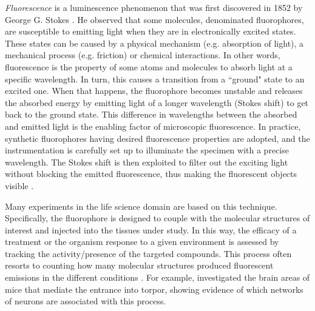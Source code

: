 \emph{Fluorescence} is a luminescence phenomenon that was first discovered in 1852 by George G. Stokes \cite{stokes2010memoir}. 
He observed that some molecules, denominated fluorophores, are susceptible to emitting light when they are in electronically excited states. These states can be caused by a physical mechanism (e.g. absorption of light), a mechanical process (e.g. friction) or chemical interactions.
In other words, fluorescence is the property of some atoms and molecules to absorb light at a specific wavelength. In turn, this causes a transition from a ``ground" state to an excited one. When that happens, the fluorophore becomes unstable and releases the absorbed energy by emitting light of a longer wavelength (Stokes shift) to get back to the ground state.
This difference in wavelengths between the absorbed and emitted light is the enabling factor of microscopic fluorescence. 
In practice, synthetic fluorophores having desired fluorescence properties are adopted, and the 
instrumentation is carefully set up to illuminate the specimen with a precise wavelength. The Stokes shift is then exploited to filter out the exciting light without blocking the emitted fluorescence, thus making the fluorescent objects visible \cite{lichtman2005fluorescence}.

Many experiments in the life science domain are based on this technique.
Specifically, the fluorophore is designed to couple with the molecular structures of interest and injected into the tissues under study. 
In this way, the efficacy of a treatment or the organism response to a given environment is assessed by tracking the activity/presence of the targeted compounds. 
This process often resorts to counting how many molecular structures produced fluorescent emissions in the different conditions \cite{hitrec2019neural, hitrec2021reversible, da2020median}.
For example,  investigated the brain areas of mice that mediate the entrance into torpor, showing evidence of which networks of neurons are associated with this process.

